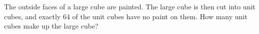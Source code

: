The outside faces of a large cube are painted. The large cube is then cut into unit cubes, and exactly $64$ of the unit cubes have no paint on them. How many unit cubes make up the large cube?

